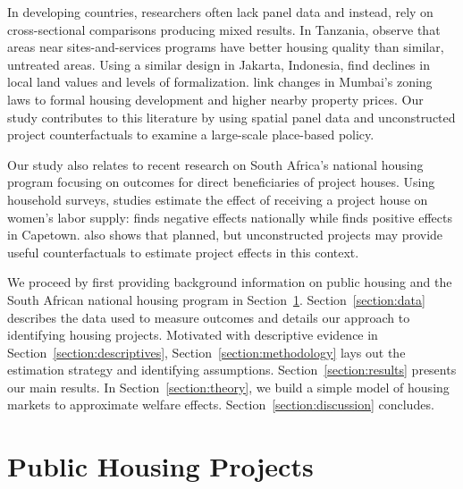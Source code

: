 \documentclass[12pt]{article}
\begin{document}
In developing countries, researchers often lack panel data and instead, rely on cross-sectional comparisons producing mixed results.  In Tanzania, \cite{baruah2017planning} observe that areas near sites-and-services programs have better housing quality than similar, untreated areas.  Using a similar design in Jakarta, Indonesia, \cite{harari2018slum} find declines in local land values and levels of formalization.  \cite{gechter2018slums} link changes in Mumbai's zoning laws to formal housing development and higher nearby property prices.  Our study contributes to this literature by using spatial panel data and unconstructed project counterfactuals to examine a large-scale place-based policy.

Our study also relates to recent research on South Africa's national housing program focusing on outcomes for direct beneficiaries of project houses.  Using household surveys, studies estimate the effect of receiving a project house on women's labor supply: \cite{picarelli2019there}  finds negative effects nationally while \cite{franklin2016enabled} finds positive effects in Capetown.  \cite{franklin2016enabled} also shows that planned, but unconstructed projects may provide useful counterfactuals to estimate project effects in this context.


We proceed by first providing background information on public housing and the South African national housing program in Section~\ref{section:background}.  Section~\ref{section:data} describes the data used to measure outcomes and details our approach to identifying housing projects. Motivated with descriptive evidence in Section~\ref{section:descriptives}, Section~\ref{section:methodology} lays out the estimation strategy and identifying assumptions. Section~\ref{section:results} presents our main results.  In Section~\ref{section:theory}, we build a simple model of housing markets to approximate welfare effects.   Section~\ref{section:discussion} concludes.




\section{Public Housing Projects}\label{section:background}
\end{document}
